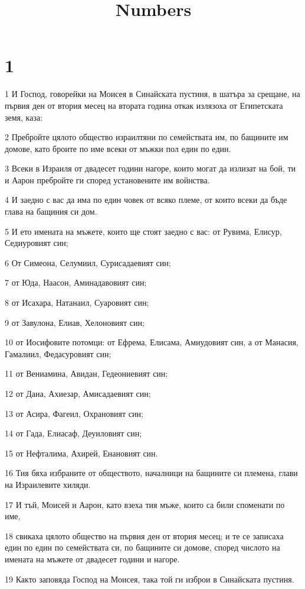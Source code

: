 

\title{Numbers}


\chapter{1}

\par 1 И Господ, говорейки на Моисея в Синайската пустиня, в шатъра за срещане, на първия ден от втория месец на втората година откак излязоха от Египетската земя, каза:
\par 2 Пребройте цялото общество израилтяни по семействата им, по бащините им домове, като броите по име всеки от мъжки пол един по един.
\par 3 Всеки в Израиля от двадесет години нагоре, които могат да излизат на бой, ти и Аарон пребройте ги според установените им войнства.
\par 4 И заедно с вас да има по един човек от всяко племе, от които всеки да бъде глава на бащиния си дом.
\par 5 И ето имената на мъжете, които ще стоят заедно с вас: от Рувима, Елисур, Седиуровият син;
\par 6 От Симеона, Селумиил, Сурисадаевият син;
\par 7 от Юда, Наасон, Аминадавовият син;
\par 8 от Исахара, Натанаил, Суаровият син;
\par 9 от Завулона, Елиав, Хелоновият син;
\par 10 от Иосифовите потомци: от Ефрема, Елисама, Амиудовият син, а от Манасия, Гамалиил, Федасуровият син;
\par 11 от Вениамина, Авидан, Гедеониевият син;
\par 12 от Дана, Ахиезар, Амисадаевият син;
\par 13 от Асира, Фагеил, Охрановият син;
\par 14 от Гада, Елиасаф, Деуиловият син;
\par 15 от Нефталима, Ахирей, Енановият син.
\par 16 Тия бяха избраните от обществото, началници на бащините си племена, глави на Израилевите хиляди.
\par 17 И тъй, Моисей и Аарон, като взеха тия мъже, които са били споменати по име,
\par 18 свикаха цялото общество на първия ден от втория месец; и те се записаха един по един по семействата си, по бащините си домове, според числото на имената на мъжете от двадесет години и нагоре.
\par 19 Както заповяда Господ на Моисея, така той ги изброи в Синайската пустиня.
